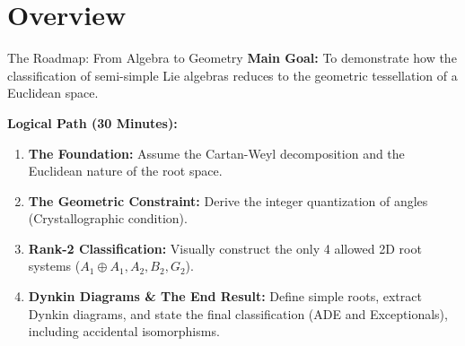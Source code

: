 \section{Overview}

\begin{frame}{The Roadmap: From Algebra to Geometry}
    \textbf{Main Goal:} To demonstrate how the classification of semi-simple Lie algebras reduces to the geometric tessellation of a Euclidean space.

    \vspace{0.3cm}
    \textbf{Logical Path (30 Minutes):}
    \begin{enumerate}
        \item \textbf{The Foundation:} Assume the Cartan-Weyl decomposition and the Euclidean nature of the root space.
        \item \textbf{The Geometric Constraint:} Derive the integer quantization of angles (Crystallographic condition).
        \item \textbf{Rank-2 Classification:} Visually construct the only 4 allowed 2D root systems ($A_1 \oplus A_1, A_2, B_2, G_2$).
        \item \textbf{Dynkin Diagrams \& The End Result:} Define simple roots, extract Dynkin diagrams, and state the final classification (ADE and Exceptionals), including accidental isomorphisms.
    \end{enumerate}
\end{frame}